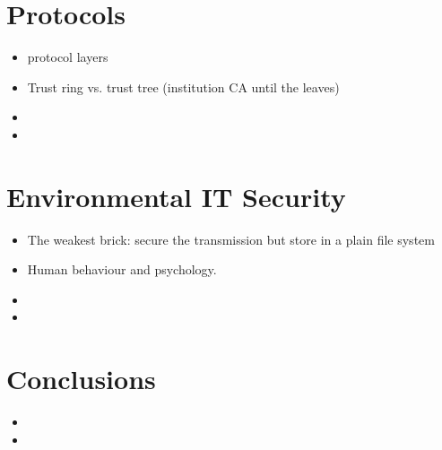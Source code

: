 \documentclass[10pt,a4paper,twoside]{llncs}
\begin{document}
%
\section{Protocols}

\begin{itemize}
 \item protocol layers \cite{Schneier:1995:ACP:572932}
 \item Trust ring vs. trust tree (institution CA until the leaves)
 \item 
 \item 
\end{itemize}

%
\section{Environmental IT Security}

\begin{itemize}
 \item The weakest brick: secure the transmission but store in a plain file system
 \item Human behaviour and psychology.
 \item 
 \item 
\end{itemize}

%
\section{Conclusions \label{sec:conclusions}}

\begin{itemize}
 \item 
 \item 
\end{itemize}



\end{document}
